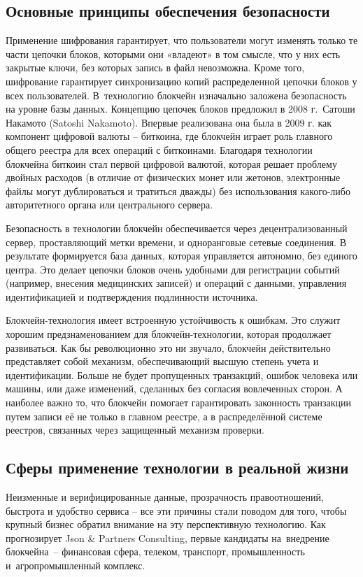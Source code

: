 \documentclass[och, master, pract]{SCWorks_fix}
\theoremstyle{plain}
\theoremstyle{plain}
\theoremstyle{plain}
\theoremstyle{definition}
\begin{document}
\subsection{Основные принципы обеспечения безопасности}

Применение шифрования гарантирует, что пользователи могут изменять только те части цепочки блоков, которыми они «владеют» в том смысле, что у них есть закрытые ключи, без которых запись в файл невозможна. Кроме того, шифрование гарантирует синхронизацию копий распределенной цепочки блоков у всех пользователей. В технологию блокчейн изначально заложена безопасность на уровне базы данных. Концепцию цепочек блоков предложил в 2008 г. Сатоши Накамото (Satoshi Nakamoto). Впервые реализована она была в 2009 г. как компонент цифровой валюты – биткоина, где блокчейн играет роль главного общего реестра для всех операций с биткоинами. Благодаря технологии блокчейна биткоин стал первой цифровой валютой, которая решает проблему двойных расходов (в отличие от физических монет или жетонов, электронные файлы могут дублироваться и тратиться дважды) без использования какого-либо авторитетного органа или центрального сервера.

Безопасность в технологии блокчейн обеспечивается через децентрализованный сервер, проставляющий метки времени, и одноранговые сетевые соединения. В результате формируется база данных, которая управляется автономно, без единого центра. Это делает цепочки блоков очень удобными для регистрации событий (например, внесения медицинских записей) и операций с данными, управления идентификацией и подтверждения подлинности источника.

Блокчейн-технология имеет встроенную устойчивость к ошибкам. Это служит хорошим предзнаменованием для блокчейн-технологии, которая продолжает развиваться. Как бы революционно это ни звучало, блокчейн действительно представляет собой механизм, обеспечивающий высшую степень учета и идентификации. Больше не будет пропущенных транзакций, ошибок человека или машины, или даже изменений, сделанных без согласия вовлеченных сторон. А наиболее важно то, что блокчейн помогает гарантировать законность транзакции путем записи её не только в главном реестре, а в распределённой системе реестров, связанных через защищенный механизм проверки.

\subsection{Сферы применение технологии в реальной жизни}
Неизменные и верифицированные данные, прозрачность правоотношений, быстрота и удобство сервиса – все эти причины стали поводом для того, чтобы крупный бизнес обратил внимание на эту перспективную технологию. Как прогнозирует Json & Partners Consulting, первые кандидаты на внедрение блокчейна – финансовая сфера, телеком, транспорт, промышленность и агропромышленный комплекс.
\end{document}
